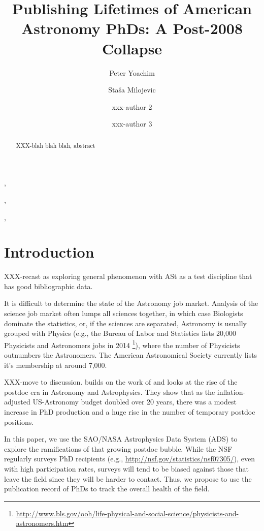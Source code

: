 \documentclass[preprint2]{aastex}
\begin{document}
\title{Publishing Lifetimes of American Astronomy PhDs: A Post-2008 Collapse}

\author{Peter Yoachim}, \author{Sta\v{s}a Milojevic}, \author{xxx-author 2}, \author{xxx-author 3} 
  


\begin{abstract}
XXX-blah blah blah, abstract

\end{abstract}



\section{Introduction}

XXX-recast as exploring general phenomenon with ASt as a test discipline that has good bibliographic data.

It is difficult to determine the state of the Astronomy job market.  Analysis of the science job market often lumps all sciences together, in which case Biologists dominate the statistics, or, if the sciences are separated, Astronomy is usually grouped with Physics (e.g., the Bureau of Labor and Statistics lists 20,000 Physicists and Astronomers jobs in 2014 \footnote{\url{http://www.bls.gov/ooh/life-physical-and-social-science/physicists-and-astronomers.htm}}), where the number of Physicists outnumbers the Astronomers.  The American Astronomical Society currently lists it's membership at around 7,000.

XXX-move to discussion. \citet{Seth09} builds on the work of \citet{Metcalfe08} and looks at the rise of the postdoc era in Astronomy and Astrophysics.  They show that as the inflation-adjusted US-Astronomy budget doubled over 20 years, there was a modest increase in PhD production and a huge rise in the number of temporary postdoc positions.

In this paper, we use the SAO/NASA Astrophysics Data System (ADS) to explore the ramifications of that growing postdoc bubble.  While the NSF regularly surveys PhD recipients (e.g., \url{http://nsf.gov/statistics/nsf07305/}), even with high participation rates, surveys will tend to be biased against those that leave the field since they will be harder to contact.  Thus, we propose to use the publication record of PhDs to track the overall health of the field.  
\end{document}
